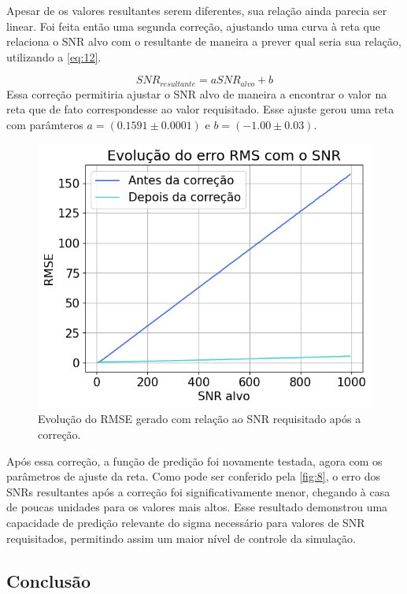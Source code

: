 \documentclass{article}
\begin{document}
Apesar de os valores resultantes serem diferentes, sua relação ainda parecia ser linear. 
Foi feita então uma segunda correção, ajustando uma curva à reta que relaciona o SNR alvo com 
o resultante de maneira a prever qual seria sua relação, utilizando a \autoref{eq:12}.

\begin{equation} \label{eq:12}
    SNR_{resultante} = a SNR_{alvo} + b    
\end{equation}
Essa correção permitiria ajustar o SNR alvo de maneira a encontrar o valor na reta que de 
fato correspondesse ao valor requisitado. Esse ajuste gerou uma reta com parâmteros 
$a = (0.1591 \pm 0.0001)$ e $b = (-1.00 \pm 0.03)$.
\begin{figure} [H]
    \includegraphics[scale=0.5]{evolucao-rmse.png}
    \centering
    \caption{Evolução do RMSE gerado com relação ao SNR requisitado após a correção.}
    \label{fig:8}
\end{figure}

Após essa correção, a função de predição foi novamente testada, agora com os parâmetros de ajuste da reta.
Como pode ser conferido pela \autoref{fig:8}, o erro dos SNRs resultantes após a correção foi 
significativamente menor, chegando à casa de poucas unidades para os valores mais altos. Esse resultado 
demonstrou uma capacidade de predição relevante do sigma necessário para valores de SNR requisitados, permitindo 
assim um maior nível de controle da simulação.

\subsection{Conclusão}
\end{document}
